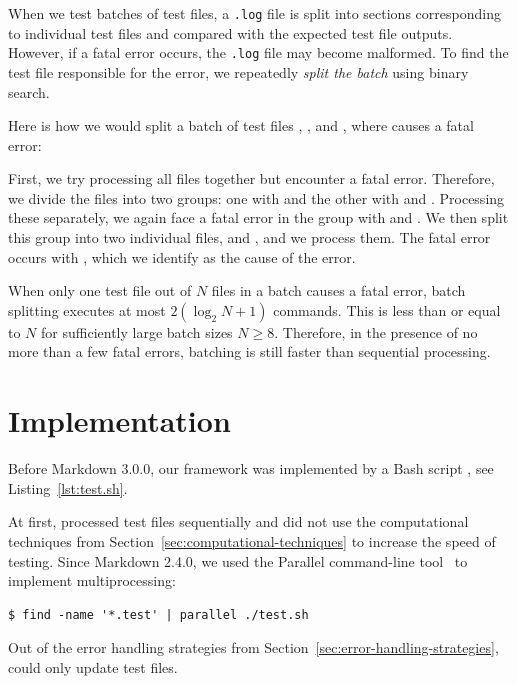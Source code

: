 \documentclass[final]{ltugboat}
\begin{document}
When we test batches of test files, a \texttt{.log} file is split into sections corresponding to individual test files and compared with the expected test file outputs. However, if a fatal error occurs, the \texttt{.log} file may become malformed. To find the test file responsible for the error, we repeatedly \emph{split the batch} using binary search.

Here is how we would split a batch of test files , , and , where  causes a fatal error:

\medskip
\noindent
\begingroup
\centering

\par
\endgroup

\medskip
\noindent
First, we try processing all files together but encounter a fatal error. Therefore, we divide the files into two groups: one with  and the other with  and . Processing these separately, we again face a fatal error in the group with  and . We then split this group into two individual files,  and , and we process them. The fatal error occurs with , which we identify as the cause of the error.

When only one test file out of $N$ files in a batch causes a fatal error, batch splitting executes at most $2 (\log_2 N + 1)$ commands. This is less than or equal to $N$ for sufficiently large batch sizes $N\geq 8$. Therefore, in the presence of no more than a few fatal errors, batching is still faster than sequential processing.

\smallskip
\noindent
\begingroup
\centering

\par
\endgroup

\section{Implementation}
\label{sec:implementation}

Before Markdown 3.0.0, our framework was implemented by a Bash script , see Listing~\ref{lst:test.sh}.

At first,  processed test files sequentially and did not use the computational techniques from Section~\ref{sec:computational-techniques} to increase the speed of testing. Since Markdown 2.4.0, we used the  Parallel command-line tool~\cite{tange2011gnu} to implement multiprocessing:
\begin{verbatim}
$ find -name '*.test' | parallel ./test.sh
\end{verbatim}
Out of the error handling strategies from Section~\ref{sec:error-handling-strategies},  could only update test files.
\end{document}
